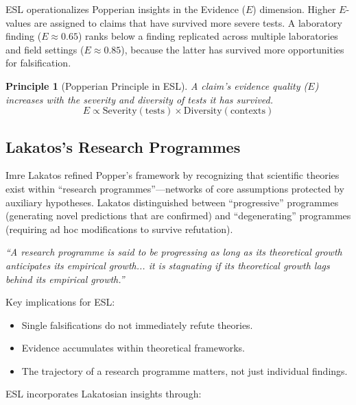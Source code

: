 \documentclass[11pt,a4paper]{article}
\newtheorem{principle}{Principle}[section]
\begin{document}
ESL operationalizes Popperian insights in the Evidence ($E$) dimension. Higher $E$-values are assigned to claims that have survived more severe tests. A laboratory finding ($E \approx 0.65$) ranks below a finding replicated across multiple laboratories and field settings ($E \approx 0.85$), because the latter has survived more opportunities for falsification.

\begin{principle}[Popperian Principle in ESL]
\label{princ:popper}
A claim's evidence quality ($E$) increases with the severity and diversity of tests it has survived.
\begin{equation}
E \propto \text{Severity}(\text{tests}) \times \text{Diversity}(\text{contexts})
\end{equation}
\end{principle}

\subsection{Lakatos's Research Programmes}

Imre Lakatos \citep{Lakatos1978} refined Popper's framework by recognizing that scientific theories exist within ``research programmes''---networks of core assumptions protected by auxiliary hypotheses. Lakatos distinguished between ``progressive'' programmes (generating novel predictions that are confirmed) and ``degenerating'' programmes (requiring ad hoc modifications to survive refutation).

\begin{historicalbox}[title={Lakatos on Progressive vs. Degenerating Programmes (1978)}]
\textit{``A research programme is said to be progressing as long as its theoretical growth anticipates its empirical growth... it is stagnating if its theoretical growth lags behind its empirical growth.''}

Key implications for ESL:
\begin{itemize}
    \item Single falsifications do not immediately refute theories.
    \item Evidence accumulates within theoretical frameworks.
    \item The trajectory of a research programme matters, not just individual findings.
\end{itemize}
\end{historicalbox}

ESL incorporates Lakatosian insights through:
\end{document}
